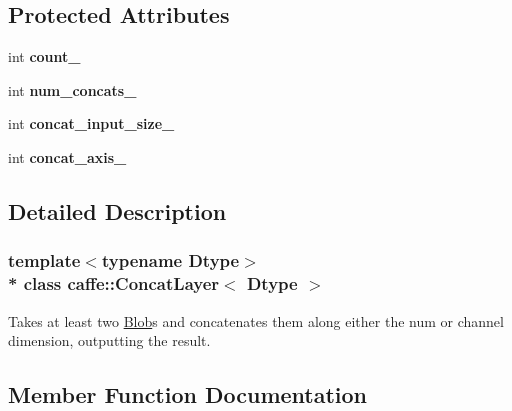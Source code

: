 \subsection*{Protected Attributes}
\begin{DoxyCompactItemize}
\item 
int {\bfseries count\+\_\+}\hypertarget{classcaffe_1_1ConcatLayer_a2e8c2179da287e21df345183f431bd72}{}\label{classcaffe_1_1ConcatLayer_a2e8c2179da287e21df345183f431bd72}

\item 
int {\bfseries num\+\_\+concats\+\_\+}\hypertarget{classcaffe_1_1ConcatLayer_a747feb42310ec1ffdead4cd96008aa8c}{}\label{classcaffe_1_1ConcatLayer_a747feb42310ec1ffdead4cd96008aa8c}

\item 
int {\bfseries concat\+\_\+input\+\_\+size\+\_\+}\hypertarget{classcaffe_1_1ConcatLayer_acdc5e611cf16cbfacfd0d3f08f1ca27f}{}\label{classcaffe_1_1ConcatLayer_acdc5e611cf16cbfacfd0d3f08f1ca27f}

\item 
int {\bfseries concat\+\_\+axis\+\_\+}\hypertarget{classcaffe_1_1ConcatLayer_aaa475cbad6d1e5e681785e69bfc536ff}{}\label{classcaffe_1_1ConcatLayer_aaa475cbad6d1e5e681785e69bfc536ff}

\end{DoxyCompactItemize}


\subsection{Detailed Description}
\subsubsection*{template$<$typename Dtype$>$\\*
class caffe\+::\+Concat\+Layer$<$ Dtype $>$}

Takes at least two \hyperlink{classcaffe_1_1Blob}{Blob}s and concatenates them along either the num or channel dimension, outputting the result. 

\subsection{Member Function Documentation}

